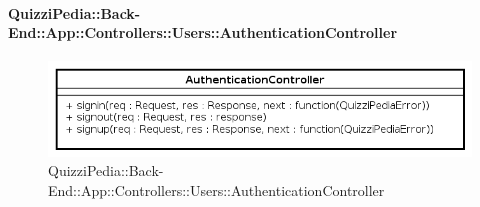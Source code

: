 \paragraph[QuizziPedia::Back-End::App::Controllers::Users\\::AuthenticationController]{QuizziPedia::Back-End::App::Controllers::Users::AuthenticationController}
\label{QuizziPedia::Back-End::App::Controllers::Users::AuthenticationController}
\begin{figure}[ht]
	\centering
	\includegraphics[scale=0.45]{UML/Classi/Back-End/QuizziPedia_Back-End_App_Controllers_Users_AuthenticationController.png}
	\caption{QuizziPedia::Back-End::App::Controllers::Users::AuthenticationController}
\end{figure}
\FloatBarrier
